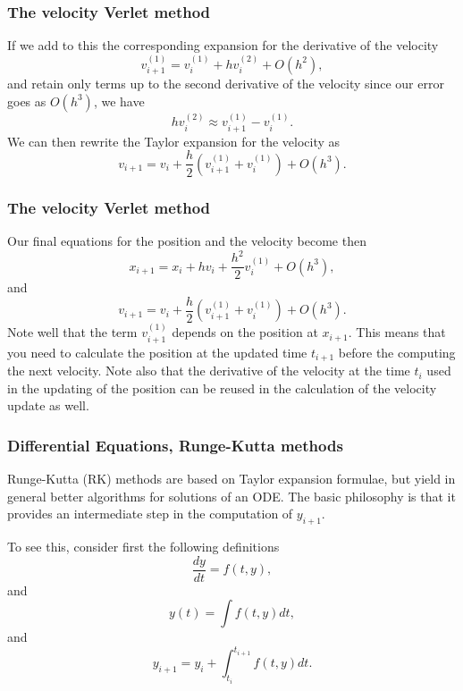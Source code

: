 \documentclass{beamer}
\begin{document}
\begin{frame}
\frametitle{The velocity Verlet method}

\begin{block}{}
If we add to this the corresponding expansion for the derivative of the velocity 
\[
v^{(1)}_{i+1} = v^{(1)}_i+hv^{(2)}_i+O(h^2), 
\]
and retain only terms up to the second derivative of the velocity since our error goes as $O(h^3)$, we have
\[
hv^{(2)}_i\approx v^{(1)}_{i+1}-v^{(1)}_i.
\]
We can then rewrite the Taylor expansion for the velocity as  
\[
v_{i+1} = v_i+\frac{h}{2}\left( v^{(1)}_{i+1}+v^{(1)}_{i}\right)+O(h^3).
\]
\end{block}
\end{frame}

\begin{frame}
\frametitle{The velocity Verlet method}

\begin{block}{}
Our final equations for the position and the velocity become then 
\[
x_{i+1} = x_i+hv_i+\frac{h^2}{2}v^{(1)}_{i}+O(h^3),
\]
and
\[
v_{i+1} = v_i+\frac{h}{2}\left( v^{(1)}_{i+1}+v^{(1)}_{i}\right)+O(h^3). 
\]
Note well that the term $v^{(1)}_{i+1}$ depends on the position at $x_{i+1}$. This means that you need to calculate 
the position at the updated time $t_{i+1}$ before the computing the next velocity.  Note also that the derivative of the velocity at the time
$t_i$ used in the updating of the position can be reused in the calculation of the velocity update as well. 
\end{block}
\end{frame}

\begin{frame}
\frametitle{Differential Equations, Runge-Kutta methods}

\begin{block}{}
Runge-Kutta (RK) methods are based on Taylor expansion formulae, but yield
in general better algorithms for solutions of an ODE.
The basic philosophy is that it provides an intermediate step in the computation of $y_{i+1}$.

To see this, consider first the following definitions
\begin{equation}
   \frac{dy}{dt}=f(t,y),  
\end{equation} 
and 
\begin{equation}
   y(t)=\int f(t,y) dt,  
\end{equation} 
and 
\begin{equation}
  y_{i+1}=y_i+ \int_{t_i}^{t_{i+1}} f(t,y) dt.
\end{equation}
\end{block}
\end{frame}
\end{document}
